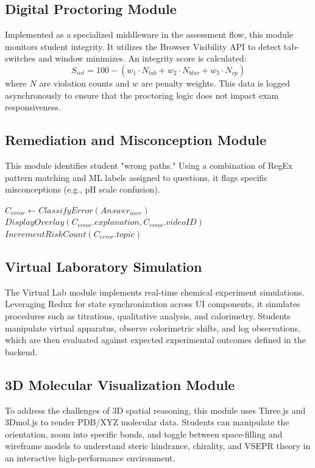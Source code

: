 \documentclass[10pt, conference]{IEEEtran}
\begin{document}
\subsection{Digital Proctoring Module}
Implemented as a specialized middleware in the assessment flow, this module monitors student integrity. It utilizes the Browser Visibility API to detect tab-switches and window minimizes. An integrity score is calculated:
\begin{equation}
S_{int} = 100 - (w_1 \cdot N_{tab} + w_2 \cdot N_{blur} + w_3 \cdot N_{cp})
\end{equation}
where $N$ are violation counts and $w$ are penalty weights. This data is logged asynchronously to ensure that the proctoring logic does not impact exam responsiveness.

\subsection{Remediation and Misconception Module}
This module identifies student "wrong paths." Using a combination of RegEx pattern matching and ML labels assigned to questions, it flags specific misconceptions (e.g., pH scale confusion). 
\begin{algorithm}
\caption{Remediation Logic}
\begin{algorithmic}
\STATE $C_{error} \gets ClassifyError(Answer_{user})$
\STATE $DisplayOverlay(C_{error}.explanation, C_{error}.videoID)$
\STATE $IncrementRiskCount(C_{error}.topic)$
\ENDIF
\ENDIF
\end{algorithmic}
\end{algorithm}

\subsection{Virtual Laboratory Simulation}
The Virtual Lab module implements real-time chemical experiment simulations. Leveraging Redux for state synchronization across UI components, it simulates procedures such as titrations, qualitative analysis, and calorimetry. Students manipulate virtual apparatus, observe colorimetric shifts, and log observations, which are then evaluated against expected experimental outcomes defined in the backend.

\subsection{3D Molecular Visualization Module}
To address the challenges of 3D spatial reasoning, this module uses Three.js and 3Dmol.js to render PDB/XYZ molecular data. Students can manipulate the orientation, zoom into specific bonds, and toggle between space-filling and wireframe models to understand steric hindrance, chirality, and VSEPR theory in an interactive high-performance environment.
\end{document}
